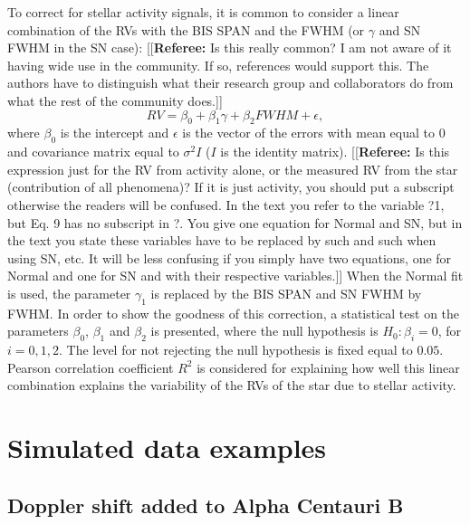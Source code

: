 \documentclass[11pt, oneside]{article}
\newcommand{\comment}[1]{{\color{red}[[\textbf{Referee: }#1]]}}
\begin{document}
To correct for stellar activity signals, it is common to consider a linear combination of the RVs with the BIS SPAN and the FWHM (or $\gamma$ and SN FWHM in the SN case):
\comment{Is this really common? I am not aware of it having wide use in the community. If so, references would support this. The authors have to distinguish what their research group and collaborators do from what the rest of the community does.}
%
\begin{equation}
RV= \beta_{0} + \beta_{1}  \gamma + \beta_{2} FWHM + \epsilon,
\label{eq:RV:correction}
\end{equation}
%
where $\beta_{0}$ is the intercept and $\epsilon$ is the vector of the errors with mean equal to $0$ and covariance matrix equal to $\sigma^{2}I$ ($I$ is the identity matrix). 
\comment{Is this expression just for the RV from activity alone, or the measured RV from the star (contribution of all phenomena)? If it is just activity, you should put a subscript otherwise the readers will be confused. In the text you refer to the variable ?1, but Eq. 9 has no subscript in ?. You give one equation for Normal and SN, but in the text you state these variables have to be replaced by such and such when using SN, etc. It will be less confusing if you simply have two equations, one for Normal and one for SN and with their respective variables.}
When the Normal fit is used, the parameter $\gamma_1$ is replaced by the BIS SPAN and SN FWHM by FWHM. In order to show the goodness of this correction, a statistical test on the parameters $\beta_{0}$, $\beta_{1}$ and $\beta_{2}$ is presented, where the null hypothesis is $H_{0}: \beta_{i}=0$, for $i=0,1,2$. The level for not rejecting the null hypothesis is fixed equal to $0.05$. Pearson correlation coefficient $R^{2}$ is considered for explaining how well this linear combination explains the variability of the RVs of the star due to stellar activity.

\section{Simulated data examples} \label{sec:soap}



\subsection{Doppler shift added to Alpha Centauri B} \label{sec:soap_real}
\end{document}
